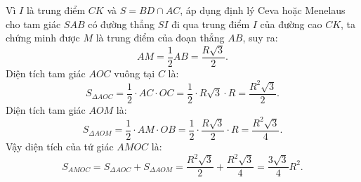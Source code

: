 \begin{bt}
{\begin{enumerate}[a)]
	Vì $I$ là trung điểm $CK$ và $S = BD \cap AC$, áp dụng định lý Ceva hoặc Menelaus cho tam giác $SAB$ có đường thẳng $SI$ đi qua trung điểm $I$ của đường cao $CK$, ta chứng minh được $M$ là trung điểm của đoạn thẳng $AB$, suy ra:
	$$ AM = \dfrac{1}{2}AB = \dfrac{R\sqrt{3}}{2}. $$
	Diện tích tam giác $AOC$ vuông tại $C$ là:
	$$ S_{\Delta AOC} = \dfrac{1}{2} \cdot AC \cdot OC = \dfrac{1}{2} \cdot R\sqrt{3} \cdot R = \dfrac{R^2\sqrt{3}}{2}. $$
	Diện tích tam giác $AOM$ là:
	$$ S_{\Delta AOM} = \dfrac{1}{2} \cdot AM \cdot OB = \dfrac{1}{2} \cdot \dfrac{R\sqrt{3}}{2} \cdot R = \dfrac{R^2\sqrt{3}}{4}. $$
	Vậy diện tích của tứ giác $AMOC$ là:
	$$ S_{AMOC} = S_{\Delta AOC} + S_{\Delta AOM} = \dfrac{R^2\sqrt{3}}{2} + \dfrac{R^2\sqrt{3}}{4} = \dfrac{3\sqrt{3}}{4}R^2. $$
\end{enumerate}
}
\end{bt}


